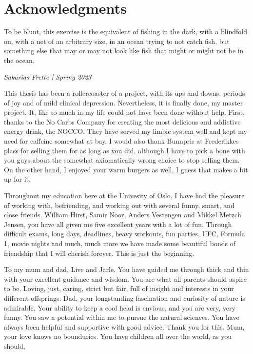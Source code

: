 \chapter*{Acknowledgments}



\epigraph{
    To be blunt, this exercise is the equivalent of fishing in the dark, 
    with a blindfold on, with a net of an arbitrary size, 
in an ocean trying to not catch fish, but something else 
that may or may not look like fish that might or might not be in the ocean.}{\textit{Sakarias Frette | Spring 2023}}

This thesis has been a rollercoaster of a project, with its ups and downs, periods of joy and of mild 
clinical depression.
Nevertheless, it is finally done, my master project. It, like so much in my life could not have been 
done without help. 
First, thanks to the No Carbs Company for creating the most delicious and addictive energy drink, 
the NOCCO. They have 
served my limbic system well and kept my need for caffeine somewhat at bay. I would also thank Bunnpris 
at Frederikkes plass 
for selling them for as long as you did, although I have to pick a bone with you guys about the somewhat axiomatically 
wrong choice to stop selling them. On the other hand, I enjoyed your warm burgers as well, I guess that makes a bit up for it. \par 
Throughout my education here at the Univesity of Oslo, I have had the pleasure of working with, befriending, 
and working out with several funny, smart, and close friends. William Hirst, Samir Noor, Anders Vestengen and 
Mikkel Metzch Jensen, you have all given me five excellent years with a lot of fun. Through difficult exams, long days, deadlines, 
heavy workouts, fun parties, UFC, Formula 1, movie nights and much, much more we have made some beautiful bonds of friendship 
that I will cherish forever. This is just the beginning. \par 
To my mum and dad, Live and Jarle. You have guided me through thick and thin with your excellent guidance and wisdom. 
You are what all parents should aspire to be. Loving, just, caring, strict but fair, full of insight and interests in your 
different offsprings. Dad, your longstanding fascination and curiosity of nature  is admirable. Your ability to keep a cool head is envious, 
and you are very, very funny. You saw a potential within me to pursue the natural sciences. You have always been helpful and supportive 
with good advice. Thank you for this. Mum, your love knows no bounduries. You have children all over the world, as you should, 
